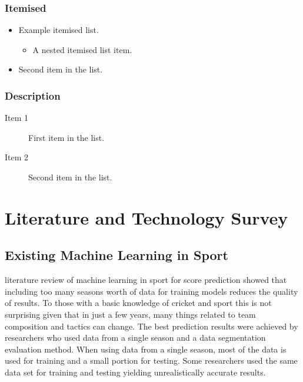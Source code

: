 \documentclass[12pt,a4paper]{report}
\begin{document}
\subsection{Itemised}

\begin{itemize}
\item Example itemised list.
  \begin{itemize}
  \item A nested itemised list item.
  \end{itemize}
\item Second item in the list.
\end{itemize}

\subsection{Description}

\begin{description}
\item[Item 1]First item in the list.
\item[Item 2]Second item in the list.
\end{description}


\chapter{Literature and Technology Survey}

\section{Existing Machine Learning in Sport}

\citet{horvat2020} literature review of machine learning in sport for score prediction showed that including too many seasons worth of data for training models reduces the quality of results. 
To those with a basic knowledge of cricket and sport this is not surprising given that in just a few years, many things related to team composition and tactics can change. 
The best prediction results were achieved by researchers who used data from a single season and a data segmentation evaluation method. 
When using data from a single season, most of the data is used for training and a small portion for testing. 
Some researchers used the same data set for training and testing yielding unrealistically accurate results.
\end{document}
